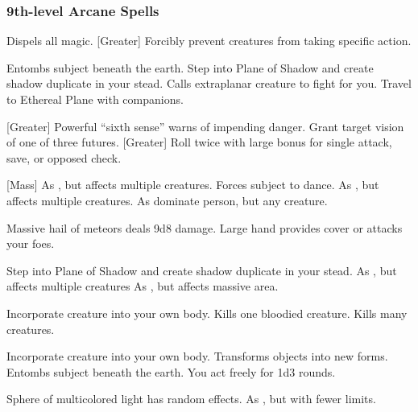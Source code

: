 \subsubsection{9th-level Arcane Spells} 
\begin{swspelllist}
     Dispels all magic.
    [Greater] Forcibly prevent creatures from taking specific action.

     Entombs subject beneath the earth.
     Step into Plane of Shadow and create shadow duplicate in your stead.
     Calls extraplanar creature to fight for you.
     Travel to Ethereal Plane with companions.

    [Greater] Powerful ``sixth sense'' warns of impending danger.
     Grant target vision of one of three futures.
    [Greater] Roll twice with large bonus for single attack, save, or opposed check.

    [Mass] As , but affects multiple creatures.
     Forces subject to dance.
     As , but affects multiple creatures.
     As dominate person, but any creature.

     Massive hail of meteors deals 9d8 damage.
    \spellhead{}
     Large hand provides cover or attacks your foes.

     Step into Plane of Shadow and create shadow duplicate in your stead.
     As , but affects multiple creatures
     As , but affects massive area.

     Incorporate creature into your own body.
     Kills one bloodied creature.
     Kills many creatures.

     Incorporate creature into your own body.
     Transforms objects into new forms.
     Entombs subject beneath the earth.
     You act freely for 1d3 rounds.

     Sphere of multicolored light has random effects.
    \M As , but with fewer limits.
\end{swspelllist}

